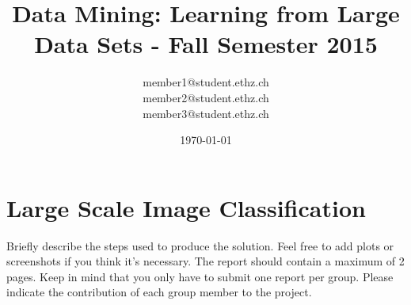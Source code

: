 \documentclass[a4paper, 11pt]{article}
\title{Data Mining: Learning from Large Data Sets - Fall Semester 2015}
\author{member1@student.ethz.ch\\ member2@student.ethz.ch\\ member3@student.ethz.ch\\}
\date{\today}
\begin{document}
\maketitle

\section*{Large Scale Image Classification} 
Briefly describe the steps used to produce the solution. Feel free to add plots or screenshots if you think it's necessary. The report should contain a maximum of 2 pages.
Keep in mind that you only have to submit one report per group. Please indicate the contribution of each group member to the project.
\end{document}
